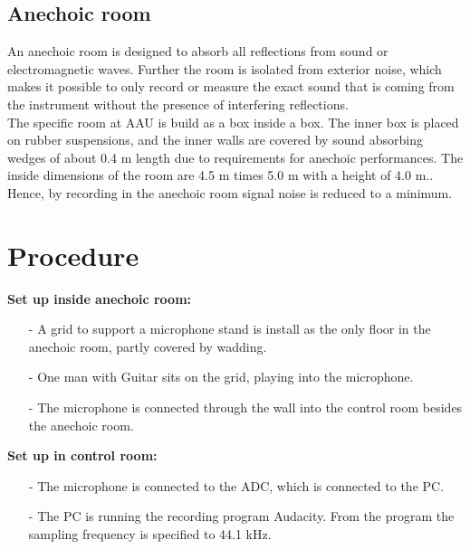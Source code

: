 \subsection{Anechoic room} 
An anechoic room is designed to absorb all reflections from sound or electromagnetic waves. Further the room is isolated from exterior noise, which makes it possible to only record or measure the exact sound that is coming from the instrument without the presence of interfering reflections. \\ The specific room at AAU is build as a box inside a box. The inner box is placed on rubber suspensions, and the inner walls are covered by sound absorbing wedges of about 0.4 m length due to requirements for anechoic performances. The inside dimensions of the room are 4.5 m times 5.0 m with a height of 4.0 m.\cite{anechoic}.\\
Hence, by recording in the anechoic room signal noise is reduced to a minimum.

\section{Procedure}
\textbf{Set up inside anechoic room:}\\
\begin{itemize}
\item[-] A grid to support a microphone stand is install as the only floor in the anechoic room, partly covered by wadding. 
\item[-] One man with Guitar sits on the grid, playing into the microphone. 
\item[-] The microphone is connected through the wall into the control room besides the anechoic room. 
\end{itemize}   
\textbf{Set up in control room: }
\begin{itemize}
\item[-] The microphone is connected to the ADC, which is connected to the PC.
\item[-] The PC is running the recording program Audacity. From the program the sampling frequency is specified to 44.1 kHz.     
\end{itemize}

